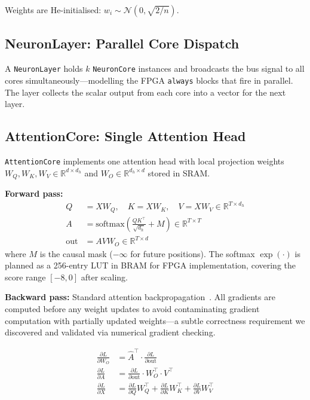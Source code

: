 \documentclass[11pt]{article}
\begin{document}
Weights are He-initialised: $w_i \sim \mathcal{N}(0, \sqrt{2/n})$.

\subsection{NeuronLayer: Parallel Core Dispatch}

A \texttt{NeuronLayer} holds $k$ \texttt{NeuronCore} instances and broadcasts the
bus signal to all cores simultaneously---modelling the FPGA \texttt{always} blocks
that fire in parallel. The layer collects the scalar output from each core into a
vector for the next layer.

\subsection{AttentionCore: Single Attention Head}

\texttt{AttentionCore} implements one attention head with local projection weights
$W_Q, W_K, W_V \in \mathbb{R}^{d \times d_h}$ and $W_O \in \mathbb{R}^{d_h \times d}$
stored in SRAM.

\textbf{Forward pass:}
\begin{align}
Q &= X W_Q, \quad K = X W_K, \quad V = X W_V \in \mathbb{R}^{T \times d_h} \\
A &= \text{softmax}\!\left(\frac{Q K^\top}{\sqrt{d_h}} + M\right) \in \mathbb{R}^{T \times T} \\
\text{out} &= A V W_O \in \mathbb{R}^{T \times d}
\end{align}
where $M$ is the causal mask ($-\infty$ for future positions). The softmax
$\exp(\cdot)$ is planned as a 256-entry LUT in BRAM for FPGA implementation,
covering the score range $[-8, 0]$ after scaling.

\textbf{Backward pass:} Standard attention backpropagation~\cite{vaswani2017attention}.
All gradients are computed before any weight updates to avoid contaminating gradient
computation with partially updated weights---a subtle correctness requirement we
discovered and validated via numerical gradient checking.

\begin{align}
\frac{\partial L}{\partial W_O} &= \hat{A}^\top \cdot \frac{\partial L}{\partial \text{out}} \\
\frac{\partial L}{\partial A} &= \frac{\partial L}{\partial \text{out}} \cdot W_O^\top \cdot V^\top \\
\frac{\partial L}{\partial X} &= \frac{\partial L}{\partial Q} W_Q^\top
  + \frac{\partial L}{\partial K} W_K^\top
  + \frac{\partial L}{\partial V} W_V^\top
\end{align}
\end{document}
